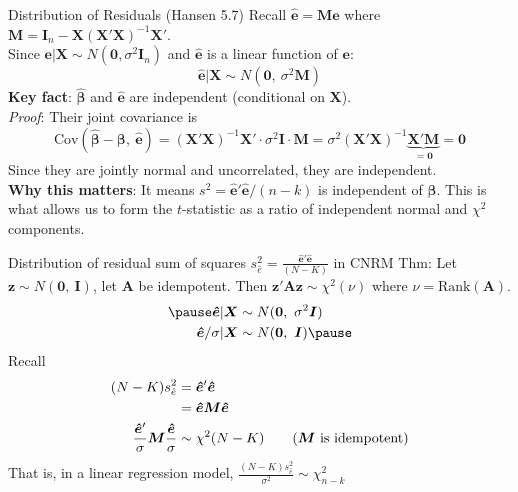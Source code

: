 \documentclass[aspectratio=169, handout, t]{beamer}
\numberwithin{equation}{section}
\begin{document}
\begin{frame}{Distribution of Residuals (Hansen 5.7)}
Recall $\bm{\hat{e}}=\bm{Me}$ where $\bm{M}=\bm{I}_n-\bm{X}(\bm{X'X})^{-1}\bm{X'}$.\\\medskip
Since $\bm{e}|\bm{X}\sim N(\bm{0},\sigma^2\bm{I}_n)$ and $\bm{\hat{e}}$ is a linear function of $\bm{e}$:
$$\bm{\hat{e}}|\bm{X}\sim N(\bm{0},\ \sigma^2\bm{M})$$\pause
\medskip
\textbf{Key fact}: $\hat{\bm{\beta}}$ and $\hat{\bm{e}}$ are \alert{independent} (conditional on $\bm{X}$).\\[4pt]
\emph{Proof}: Their joint covariance is
$$\text{Cov}(\hat{\bm{\beta}}-\bm{\beta},\ \hat{\bm{e}})=(\bm{X'X})^{-1}\bm{X'}\cdot\sigma^2\bm{I}\cdot\bm{M}=\sigma^2(\bm{X'X})^{-1}\underbrace{\bm{X'M}}_{=\bm{0}}=\bm{0}$$
Since they are jointly normal and uncorrelated, they are independent.\\\pause
\medskip
\textbf{Why this matters}: It means $s^2=\hat{\bm{e}}'\hat{\bm{e}}/(n-k)$ is independent of $\hat{\bm{\beta}}$.  This is what allows us to form the $t$-statistic as a ratio of independent normal and $\chi^2$ components.
\end{frame}

\begin{frame}{Distribution of residual sum of squares $s_{\hat{e}}^2=\frac{\bm{\hat{e}'\hat{e}}}{(N-K)}$  in CNRM}
Thm: Let $\bm{z}\sim N(\bm{0},\ \bm{I})$, let $\bm{A}$ be idempotent.  Then $\bm{z}'\bm{A}\bm{z}\sim \chi^2(\nu)$ where $\nu=\text{Rank}(\bm{A})$.
\begin{align*}\pause
\bm{\hat{e}}|\bm{X} &\sim N(\bm{0},\ \sigma^2\bm{I})\\
\bm{\hat{e}}/\sigma|\bm{X} &\sim N(\bm{0},\ \bm{I}) \pause
\end{align*}
Recall
\begin{align*}
(N-K)s_{\hat{e}}^2&=\bm{\hat{e}}'\bm{\hat{e}}\\
&=\bm{\hat{e}}\bm{M}\bm{\hat{e}}\\
\frac{\bm{\hat{e}}'}{\sigma}\bm{M}\frac{\bm{\hat{e}}}{\sigma}&\sim \chi^2(N-K) \tag{$\bm{M}$ is idempotent}
\end{align*}
That is, in a linear regression model, $\frac{(N-K)s_{\hat{e}}^2}{\sigma^2}\sim \chi^2_{n-k}$
\end{frame}
\end{document}
